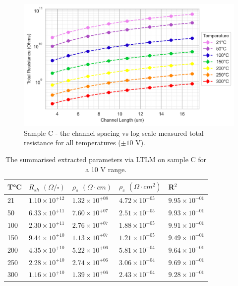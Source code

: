 \begin{refsection}
\begin{figure}[H]
    \centering
    \includegraphics[width=\textwidth]{Chapter3/Figs/Raster/Sample C 2019/TLM/All Lin Reg TLM Plot Log scale.png}
    \caption{Sample C - the channel spacing vs log scale measured total resistance for all temperatures ($\pm10$ \si{\volt}).}
    \label{fig:c_tlm_log}
\end{figure}

\begin{table}[h]
\caption{The summarised extracted parameters via LTLM on sample C for a 10 V range.}
\label{tab:c_ltlmss}
\centering
\begin{tabular}{lllll}
\toprule
T\si{\degreeCelsius} & $R_{sh}$ $(\Omega/\square)$ & $\rho_{s}$ $(\Omega\cdot cm)$ & $\rho_{c}$ $(\Omega\cdot cm^2)$ & R$^2$ \\
\midrule
21 & $1.10\times 10^{+12}$ & $1.32\times 10^{+08}$ & $4.72\times 10^{+05}$ & $9.95\times 10^{-01}$ \\
50 & $6.33\times 10^{+11}$ & $7.60\times 10^{+07}$ & $2.51\times 10^{+05}$ & $9.93\times 10^{-01}$ \\
100 & $2.30\times 10^{+11}$ & $2.76\times 10^{+07}$ & $1.88\times 10^{+05}$ & $9.91\times 10^{-01}$ \\
150 & $9.44\times 10^{+10}$ & $1.13\times 10^{+07}$ & $1.21\times 10^{+05}$ & $9.49\times 10^{-01}$ \\
200 & $4.35\times 10^{+10}$ & $5.22\times 10^{+06}$ & $5.81\times 10^{+04}$ & $9.64\times 10^{-01}$ \\
250 & $2.28\times 10^{+10}$ & $2.74\times 10^{+06}$ & $3.06\times 10^{+04}$ & $9.69\times 10^{-01}$ \\
300 & $1.16\times 10^{+10}$ & $1.39\times 10^{+06}$ & $2.43\times 10^{+04}$ & $9.28\times 10^{-01}$ \\
\bottomrule
\end{tabular}
\end{table}


\end{refsection}
